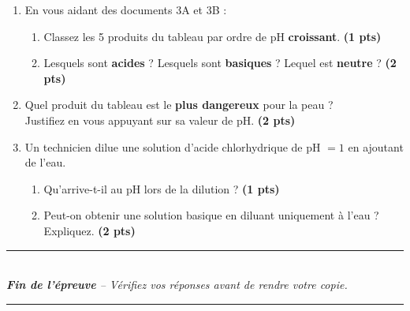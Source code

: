 \documentclass[12pt,a4paper]{article}
\newenvironment{questions}{}{}
\newcommand{\pts}[1]{\hfill\textcolor{bleuDNB}{\textbf{(#1 pts)}}}
\begin{document}
\begin{questions}
\begin{enumerate}[label=\textbf{\arabic*.}, leftmargin=*, itemsep=4mm]

\item En vous aidant des documents 3A et 3B :
\begin{enumerate}[label=\alph*), itemsep=2mm]
  \item Classez les 5 produits du tableau par ordre de pH \textbf{croissant}. \pts{1}
  \item Lesquels sont \textbf{acides} ? Lesquels sont \textbf{basiques} ? Lequel est \textbf{neutre} ? \pts{2}
\end{enumerate}

\item Quel produit du tableau est le \textbf{plus dangereux} pour la peau ?\\
Justifiez en vous appuyant sur sa valeur de pH. \pts{2}

\item Un technicien dilue une solution d'acide chlorhydrique de pH $= 1$ en ajoutant de l'eau.
\begin{enumerate}[label=\alph*), itemsep=2mm]
  \item Qu'arrive-t-il au pH lors de la dilution ? \pts{1}
  \item Peut-on obtenir une solution basique en diluant uniquement \`a l'eau ? Expliquez. \pts{2}
\end{enumerate}

\end{enumerate}
\end{questions}

\vspace{8mm}
\begin{center}
  {\color{bleuDNB}\rule{0.6\linewidth}{1pt}}\\[3mm]
  \textit{\textbf{Fin de l'\'epreuve} -- V\'erifiez vos r\'eponses avant de rendre votre copie.}\\[2mm]
  {\color{bleuDNB}\rule{0.6\linewidth}{1pt}}
\end{center}
\end{document}
